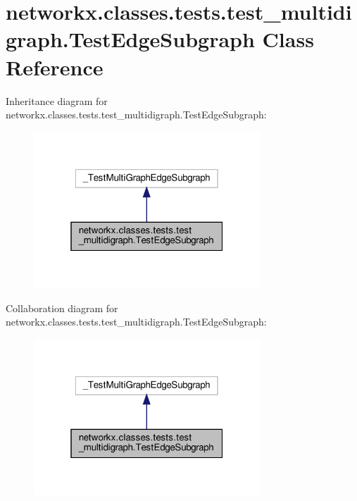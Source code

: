 \hypertarget{classnetworkx_1_1classes_1_1tests_1_1test__multidigraph_1_1TestEdgeSubgraph}{}\section{networkx.\+classes.\+tests.\+test\+\_\+multidigraph.\+Test\+Edge\+Subgraph Class Reference}
\label{classnetworkx_1_1classes_1_1tests_1_1test__multidigraph_1_1TestEdgeSubgraph}


Inheritance diagram for networkx.\+classes.\+tests.\+test\+\_\+multidigraph.\+Test\+Edge\+Subgraph\+:
\nopagebreak
\begin{figure}[H]
\begin{center}
\leavevmode
\includegraphics[width=241pt]{classnetworkx_1_1classes_1_1tests_1_1test__multidigraph_1_1TestEdgeSubgraph__inherit__graph}
\end{center}
\end{figure}


Collaboration diagram for networkx.\+classes.\+tests.\+test\+\_\+multidigraph.\+Test\+Edge\+Subgraph\+:
\nopagebreak
\begin{figure}[H]
\begin{center}
\leavevmode
\includegraphics[width=241pt]{classnetworkx_1_1classes_1_1tests_1_1test__multidigraph_1_1TestEdgeSubgraph__coll__graph}
\end{center}
\end{figure}
